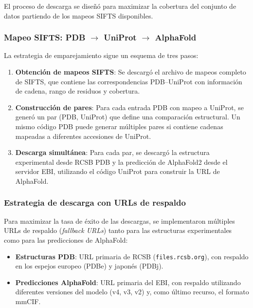 El proceso de descarga se dise\~n\'o para maximizar la cobertura del conjunto de datos partiendo de los mapeos SIFTS disponibles.

\subsubsection{Mapeo SIFTS: PDB $\rightarrow$ UniProt $\rightarrow$ AlphaFold}
\label{subsubsec:mapeo}

La estrategia de emparejamiento sigue un esquema de tres pasos:

\begin{enumerate}
    \item \textbf{Obtenci\'on de mapeos SIFTS}: Se descarg\'o el archivo de mapeos completo de SIFTS, que contiene las correspondencias PDB--UniProt con informaci\'on de cadena, rango de residuos y cobertura.

    \item \textbf{Construcci\'on de pares}: Para cada entrada PDB con mapeo a UniProt, se gener\'o un par (PDB, UniProt) que define una comparaci\'on estructural. Un mismo c\'odigo PDB puede generar m\'ultiples pares si contiene cadenas mapeadas a diferentes accesiones de UniProt.

    \item \textbf{Descarga simult\'anea}: Para cada par, se descarg\'o la estructura experimental desde RCSB PDB y la predicci\'on de AlphaFold2 desde el servidor EBI, utilizando el c\'odigo UniProt para construir la URL de AlphaFold.
\end{enumerate}

\subsubsection{Estrategia de descarga con URLs de respaldo}

Para maximizar la tasa de \'exito de las descargas, se implementaron m\'ultiples URLs de respaldo (\textit{fallback URLs}) tanto para las estructuras experimentales como para las predicciones de AlphaFold:

\begin{itemize}
    \item \textbf{Estructuras PDB}: URL primaria de RCSB (\texttt{files.rcsb.org}), con respaldo en los espejos europeo (PDBe) y japon\'es (PDBj).
    \item \textbf{Predicciones AlphaFold}: URL primaria del EBI, con respaldo utilizando diferentes versiones del modelo (v4, v3, v2) y, como \'ultimo recurso, el formato mmCIF.
\end{itemize}


